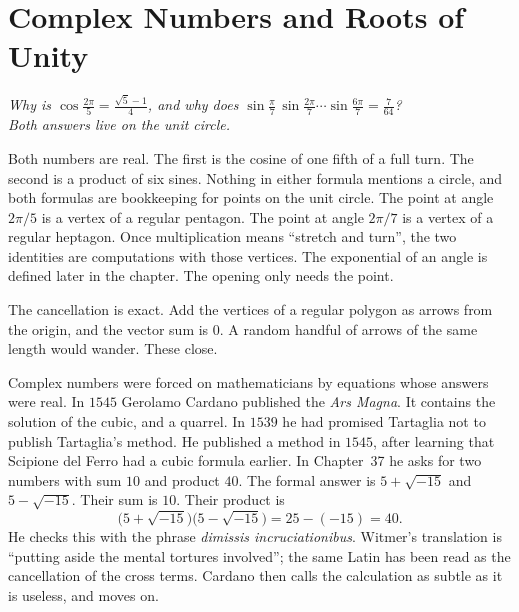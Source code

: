 \chapter{Complex Numbers and Roots of Unity}\label{ch:complex}

\begin{center}\itshape
Why is $\cos\frac{2\pi}5=\frac{\sqrt5-1}4$, and why does $\sin\frac\pi7\,\sin\frac{2\pi}7\cdots\sin\frac{6\pi}7=\frac7{64}$?\\
Both answers live on the unit circle.
\end{center}

Both numbers are real. The first is the cosine of one fifth of a full turn. The second is a product of six sines. Nothing in either formula mentions a circle, and both formulas are bookkeeping for points on the unit circle. The point at angle $2\pi/5$ is a vertex of a regular pentagon. The point at angle $2\pi/7$ is a vertex of a regular heptagon. Once multiplication means ``stretch and turn'', the two identities are computations with those vertices. The exponential of an angle is defined later in the chapter. The opening only needs the point.

The cancellation is exact. Add the vertices of a regular polygon as arrows from the origin, and the vector sum is $0$. A random handful of arrows of the same length would wander. These close.

Complex numbers were forced on mathematicians by equations whose answers were real. In $1545$ Gerolamo Cardano published the \emph{Ars Magna}. It contains the solution of the cubic, and a quarrel. In $1539$ he had promised Tartaglia not to publish Tartaglia's method. He published a method in $1545$, after learning that Scipione del Ferro had a cubic formula earlier. In Chapter~37 he asks for two numbers with sum $10$ and product $40$. The formal answer is $5+\sqrt{-15}$ and $5-\sqrt{-15}$. Their sum is $10$. Their product is
\[
\bigl(5+\sqrt{-15}\bigr)\bigl(5-\sqrt{-15}\bigr)=25-(-15)=40.
\]
He checks this with the phrase \emph{dimissis incruciationibus}. Witmer's translation is ``putting aside the mental tortures involved''; the same Latin has been read as the cancellation of the cross terms. Cardano then calls the calculation as subtle as it is useless, and moves on.

